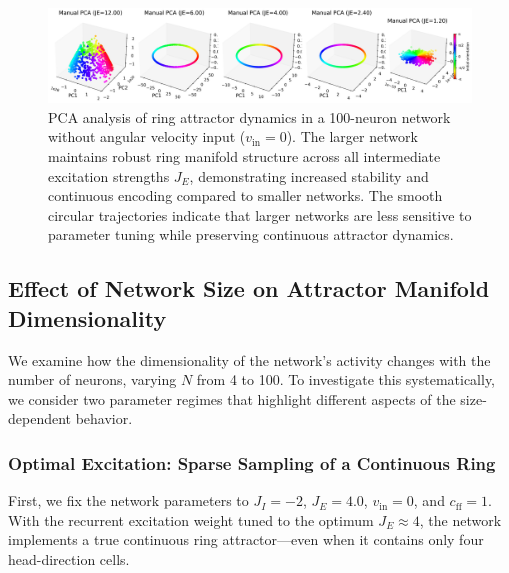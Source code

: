 \documentclass[11pt,a4paper]{article}
\begin{document}

\begin{figure}[H]
\centering
\includegraphics[width=1.0\textwidth]{manual_pca_large_network.png}
\caption{PCA analysis of ring attractor dynamics in a 100-neuron network without angular velocity input (\( v_{\text{in}} = 0 \)). The larger network maintains robust ring manifold structure across all intermediate excitation strengths \( J_E \), demonstrating increased stability and continuous encoding compared to smaller networks. The smooth circular trajectories indicate that larger networks are less sensitive to parameter tuning while preserving continuous attractor dynamics.}
\label{fig:pca_100_neurons}
\end{figure}


\subsection*{Effect of Network Size on Attractor Manifold Dimensionality}

We examine how the dimensionality of the network's activity changes with the number of neurons, varying $N$ from 4 to 100. To investigate this systematically, we consider two parameter regimes that highlight different aspects of the size-dependent behavior.

\subsubsection*{Optimal Excitation: Sparse Sampling of a Continuous Ring}

First, we fix the network parameters to $J_I = -2$, $J_E = 4.0$, $v_{\text{in}} = 0$, and $c_{\text{ff}} = 1$. With the recurrent excitation weight tuned to the optimum $J_E \approx 4$, the network implements a true continuous ring attractor—even when it contains only four head-direction cells. 
\end{document}
